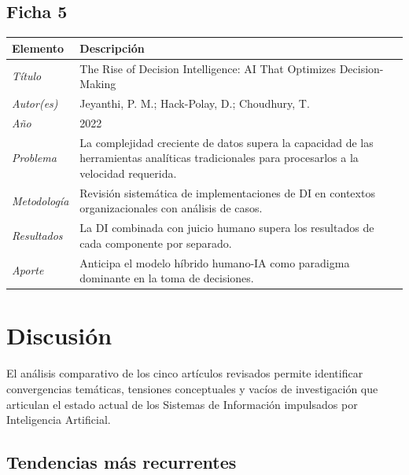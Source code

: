 \documentclass[conference]{IEEEtran}
\begin{document}
\subsection*{Ficha 5}
\begin{center}
\small
\begin{minipage}{\columnwidth}
\label{tab:ficha5}
\begin{tabular}{p{1.6cm} p{5.9cm}}
\toprule
\textbf{Elemento} & \textbf{Descripción} \\
\midrule
\textit{Título} & The Rise of Decision Intelligence: AI That Optimizes Decision-Making \\
\addlinespace
\textit{Autor(es)} & Jeyanthi, P. M.; Hack-Polay, D.; Choudhury, T. \\
\addlinespace
\textit{Año} & 2022 \\
\addlinespace
\textit{Problema} & La complejidad creciente de datos supera la capacidad de las herramientas analíticas tradicionales para procesarlos a la velocidad requerida. \\
\addlinespace
\textit{Metodología} & Revisión sistemática de implementaciones de DI en contextos organizacionales con análisis de casos. \\
\addlinespace
\textit{Resultados} & La DI combinada con juicio humano supera los resultados de cada componente por separado. \\
\addlinespace
\textit{Aporte} & Anticipa el modelo híbrido humano-IA como paradigma dominante en la toma de decisiones. \\
\bottomrule
\end{tabular}
\end{minipage}
\end{center}
 
 
\section{Discusión}
 
El análisis comparativo de los cinco artículos revisados permite identificar convergencias temáticas, tensiones conceptuales y vacíos de investigación que articulan el estado actual de los Sistemas de Información impulsados por Inteligencia Artificial.
 
\subsection{Tendencias más recurrentes}
 
\end{document}
